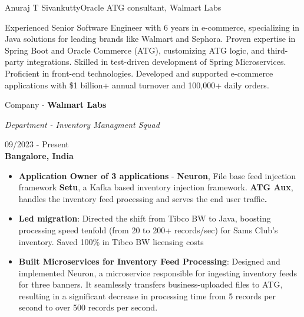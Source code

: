 \documentclass{article}
\begin{document}
\begin{cv}{Anuraj T Sivankutty}{Oracle ATG consultant, Walmart Labs}



Experienced Senior Software Engineer with 6 years in e-commerce, specializing in Java solutions for leading brands like Walmart and Sephora. Proven expertise in Spring Boot and Oracle Commerce (ATG), customizing ATG logic, and third-party integrations. Skilled in test-driven development of Spring Microservices. Proficient in front-end technologies. Developed and supported e-commerce applications with \$1 billion+ annual turnover and 100,000+ daily orders.



\begin{cvevent}[Jan-2020][present]


\begin{center}
  \begin{minipage}{0.6\textwidth}
    Company - \textbf{Walmart Labs}
    \vspace{0.1cm}
    
    \textit{Department - Inventory Managment Squad}
  \end{minipage}
  \hfill
  \begin{minipage}{0.35\textwidth}
    \small{09/2023 - Present} \\
    \textbf{Bangalore, India}
  \end{minipage}
\end{center}



    
    \begin{itemize}
        \item  \textbf{Application Owner of 3 applications }- \textbf{Neuron}, File base feed injection framework \textbf{Setu}, a Kafka based inventory injection framework. \textbf{ATG Aux}, handles the inventory feed processing and serves the end user traffic\textbf{.}

        \item \textbf{Led migration}: Directed the shift from Tibco BW to Java, boosting processing speed tenfold (from 20 to 200+ records/sec) for Sams Club's inventory. Saved 100\% in Tibco BW licensing costs 
        \item  \textbf{Built Microservices for Inventory Feed Processing}: Designed and implemented Neuron, a microservice responsible for ingesting inventory feeds for three banners. It seamlessly transfers business-uploaded files to ATG, resulting in a significant decrease in processing time from 5 records per second to over 500 records per second.


\end{itemize}
\end{cvevent}
\end{cv}
\end{document}

